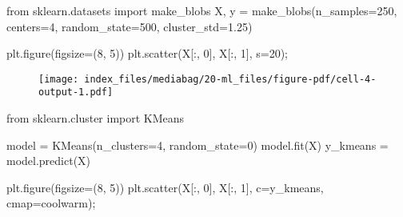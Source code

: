 \documentclass[
  letterpaper,
  DIV=11,
  numbers=noendperiod]{scrreprt}
\newenvironment{Shaded}{\begin{snugshade}}{\end{snugshade}}
\newcommand{\DecValTok}[1]{\textcolor[rgb]{0.68,0.00,0.00}{#1}}
\newcommand{\FloatTok}[1]{\textcolor[rgb]{0.68,0.00,0.00}{#1}}
\newcommand{\ImportTok}[1]{\textcolor[rgb]{0.00,0.46,0.62}{#1}}
\newcommand{\NormalTok}[1]{\textcolor[rgb]{0.00,0.23,0.31}{#1}}
\newcommand{\OperatorTok}[1]{\textcolor[rgb]{0.37,0.37,0.37}{#1}}
\newcommand{\StringTok}[1]{\textcolor[rgb]{0.13,0.47,0.30}{#1}}
\begin{document}
\begin{Shaded}
\begin{Highlighting}[]
\ImportTok{from}\NormalTok{ sklearn.datasets }\ImportTok{import}\NormalTok{ make\_blobs}
\NormalTok{X, y }\OperatorTok{=}\NormalTok{ make\_blobs(n\_samples}\OperatorTok{=}\DecValTok{250}\NormalTok{, centers}\OperatorTok{=}\DecValTok{4}\NormalTok{,}
\NormalTok{                  random\_state}\OperatorTok{=}\DecValTok{500}\NormalTok{, cluster\_std}\OperatorTok{=}\FloatTok{1.25}\NormalTok{)}

\NormalTok{plt.figure(figsize}\OperatorTok{=}\NormalTok{(}\DecValTok{8}\NormalTok{, }\DecValTok{5}\NormalTok{)) }
\NormalTok{plt.scatter(X[:, }\DecValTok{0}\NormalTok{], X[:, }\DecValTok{1}\NormalTok{], s}\OperatorTok{=}\DecValTok{20}\NormalTok{)}\OperatorTok{;} 
\end{Highlighting}
\end{Shaded}

\begin{figure}[H]

{\centering \texttt{[image: index\_files/mediabag/20-ml\_files/figure-pdf/cell-4-output-1.pdf]}

}

\end{figure}

\begin{Shaded}
\begin{Highlighting}[]
\ImportTok{from}\NormalTok{ sklearn.cluster }\ImportTok{import}\NormalTok{ KMeans}
\end{Highlighting}
\end{Shaded}

\begin{Shaded}
\begin{Highlighting}[]
\NormalTok{model }\OperatorTok{=}\NormalTok{ KMeans(n\_clusters}\OperatorTok{=}\DecValTok{4}\NormalTok{, random\_state}\OperatorTok{=}\DecValTok{0}\NormalTok{)}
\NormalTok{model.fit(X) }
\NormalTok{y\_kmeans }\OperatorTok{=}\NormalTok{ model.predict(X)}
\end{Highlighting}
\end{Shaded}

\begin{Shaded}
\begin{Highlighting}[]
\NormalTok{plt.figure(figsize}\OperatorTok{=}\NormalTok{(}\DecValTok{8}\NormalTok{, }\DecValTok{5}\NormalTok{)) }
\NormalTok{plt.scatter(X[:, }\DecValTok{0}\NormalTok{], X[:, }\DecValTok{1}\NormalTok{], c}\OperatorTok{=}\NormalTok{y\_kmeans, cmap}\OperatorTok{=}\StringTok{\textquotesingle{}coolwarm\textquotesingle{}}\NormalTok{)}\OperatorTok{;} 
\end{Highlighting}
\end{Shaded}
\end{document}
